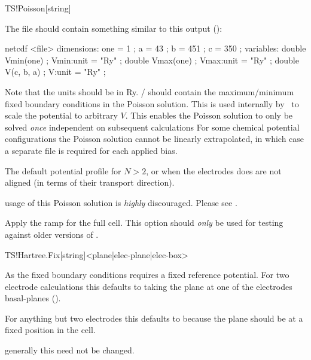 \begin{fdfentry}{TS!Poisson}[string]
\begin{fdfoptions}
    The file should contain something similar to this output
    ():
    \begin{shellexample}
netcdf <file> {
dimensions:
	one = 1 ;
	a = 43 ;
	b = 451 ;
	c = 350 ;
variables:
	double Vmin(one) ;
		Vmin:unit = "Ry" ;
	double Vmax(one) ;
		Vmax:unit = "Ry" ;
	double V(c, b, a) ;
		V:unit = "Ry" ;
}
    \end{shellexample}
    Note that the units should be in Ry. /
    should contain the maximum/minimum fixed boundary conditions in
    the Poisson solution. This is used internally by \tsiesta\ to
    scale the potential to arbitrary $V$. This enables the Poisson
    solution to only be solved \emph{once} independent on subsequent
    calculations For some chemical potential configurations the
    Poisson solution cannot be linearly extrapolated, in which case a
    separate file is required for each applied bias.

    

    The default potential profile for $N>2$, or when the electrodes
    does are not aligned (in terms of their transport direction).
    
    \note usage of this Poisson solution is \emph{highly}
    discouraged. Please see .


    Apply the ramp for the full cell. This option should \emph{only}
    be used for testing against older versions of \tsiesta.

  \end{fdfoptions}
  
\end{fdfentry}

\begin{fdfentry}{TS!Hartree.Fix}[string]<plane|elec-plane|elec-box>

  As the fixed boundary conditions requires a fixed reference
  potential. For two electrode calculations this defaults to taking
  the plane at one of the electrodes basal-planes (). 

  For anything but two electrodes this defaults to 
  because the plane should be at a fixed position in the cell. 

  \note generally this need not be changed.

\end{fdfentry}

